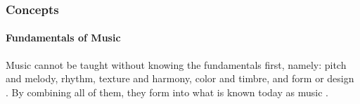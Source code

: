         
        \begin{comment}
      
        
        Composers often start off with a certain sequence of notes that dictate the theme of their musical composition, this is called the motif. This is the repeating series of notes that occur in different parts of the musical composition. It is also often used to create the last song syndrome (LSS) in most of the songs today.
        
        
        From the motif, the composer can then use chord progressions or melodic intervals in order to expand the composition with respect to music theory. However, composers would have to choose those creatively in order to set the mood or emotion that the composition or song wants to portray to listeners.
        
        
        With the recurring theme in the composition, composers are faced with the problem of imitating the motif throughout different parts of the song. Copy pasting is often used in musical notation softwares in order to achieve this. However tweaking through transposing, elongation, or inverting the motif is also evident in order to build variation in delivering the motif in compositions.
        
        \end{comment}
        
        \subsubsection{Concepts}
        
        \paragraph{Fundamentals of Music}
        
        Music cannot be taught without knowing the fundamentals first, namely: pitch and melody, rhythm, texture and harmony, color and timbre, and form or design \citep{rivadelo1986fundamentals}. By combining all of them, they form into what is known today as music \citep{willoughby1971comprehensive}.
        
